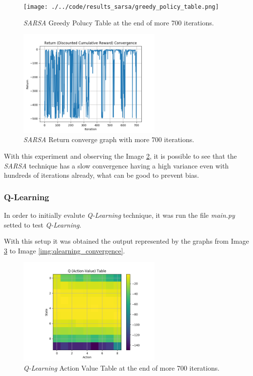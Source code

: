 \documentclass[journal]{IEEEtran}
\begin{document}
\begin{figure}
  \begin{center}
  \texttt{[image: ./../code/results\_sarsa/greedy\_policy\_table.png]}
  \caption{\textit{SARSA} Greedy Polucy Table at the end of more 700 iterations.}
  \label{img:sarsa_greedy}
  \end{center}
\end{figure}

\begin{figure}
  \begin{center}
  \includegraphics[width=2.8in]{./../code/results_sarsa/return_convergence.png}
  \caption{\textit{SARSA} Return converge graph with more 700 iterations.}
  \label{img:sarsa_convergence}
  \end{center}
\end{figure}

With this experiment and observing the Image \ref{img:sarsa_convergence}, it is possible to see that the \textit{SARSA} technique has a slow convergence having a high variance even with hundreds of iterations already, what can be good to prevent bias.

\subsubsection{Q-Learning}
In order to initially evalute \textit{Q-Learning} technique, it was run the file \textit{main.py} setted to test \textit{Q-Learning}.

With this setup it was obtained the output represented by the graphs from Image \ref{img:qlearning_action} to Image \ref{img:qlearning_convergence}.

\begin{figure}
  \begin{center}
  \includegraphics[width=2.8in]{./../code/results_q_learning/action_value_table.png}
  \caption{\textit{Q-Learning} Action Value Table at the end of more 700 iterations.}
  \label{img:qlearning_action}
  \end{center}
\end{figure}
\end{document}
